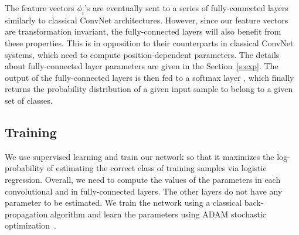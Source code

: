 \documentclass[10pt,journal,compsoc]{IEEEtran}
\begin{document}
	The feature vectors $\phi_i$'s are eventually sent to a series of fully-connected layers similarly to classical ConvNet architectures. However, since our feature vectors are transformation invariant, the fully-connected layers will also benefit from these properties. This is in opposition to their counterparts in classical ConvNet systems, which need to compute position-dependent parameters. The details about fully-connected layer parameters are given in the Section~\ref{s:exp}. The output of the fully-connected layers is then fed to a softmax layer \cite{bb:bishop:2006softmax}, which finally returns the probability distribution of a given input sample to belong to a given set of classes.

	\subsection{Training}
	We use supervised learning and train our network so that it maximizes the log-probability of estimating the correct class of training samples via logistic regression. Overall, we need to compute the values of the parameters in each convolutional and in fully-connected layers. The other layers do not have any parameter to be estimated.  We train the network using a classical back-propagation algorithm and learn the parameters using ADAM stochastic optimization~\cite{bb:adam}.
\end{document}
